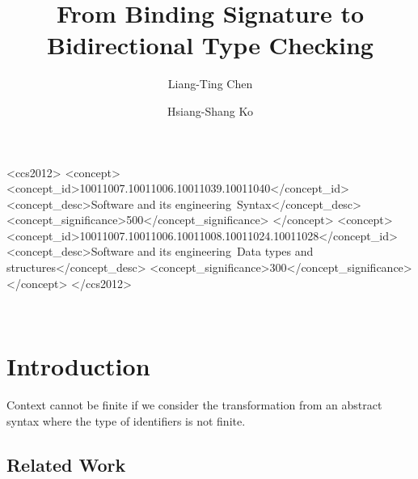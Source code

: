 \documentclass[acmsmall,review]{acmart}\settopmatter{printfolios=true,printccs=false,printacmref=false}
\theoremstyle{acmdefinition}
\begin{document}
\title{From Binding Signature to Bidirectional Type Checking}
\author{Liang-Ting Chen}
\author{Hsiang-Shang Ko}
\begin{abstract}


\end{abstract}

\begin{CCSXML}
<ccs2012>
   <concept>
       <concept_id>10011007.10011006.10011039.10011040</concept_id>
       <concept_desc>Software and its engineering~Syntax</concept_desc>
       <concept_significance>500</concept_significance>
       </concept>
   <concept>
       <concept_id>10011007.10011006.10011008.10011024.10011028</concept_id>
       <concept_desc>Software and its engineering~Data types and structures</concept_desc>
       <concept_significance>300</concept_significance>
       </concept>
 </ccs2012>
\end{CCSXML}


\maketitle

\todototoc
{}\\

\section{Introduction}
Context cannot be finite if we consider the transformation from an abstract syntax where the type of identifiers is not finite.

\subsection{Related Work}
\end{document}
